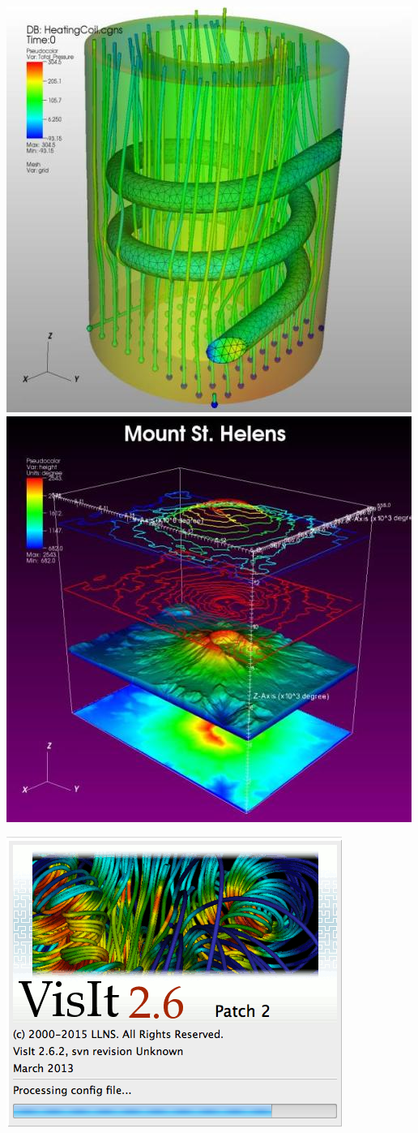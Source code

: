 \begin{frame}
\begin{columns}
\begin{column}{7cm}
        \href{https://wci.llnl.gov/simulation/computer-codes/visit/gallery}{\includegraphics[width=.475\columnwidth]{figs/visit-exs/VisIt-gallery_12}}
        \href{https://wci.llnl.gov/simulation/computer-codes/visit/gallery}{\includegraphics[width=.475\columnwidth]{figs/visit-exs/VisIt-gallery_15}}

        \centering
        \href{https://wci.llnl.gov/simulation/computer-codes/visit/}{\includegraphics[width=.45\columnwidth, clip=true,trim=0 2cm 0 0]{./figs/visit-logos//VisIt26}}
    \end{column}
    \end{columns}



\end{frame}


